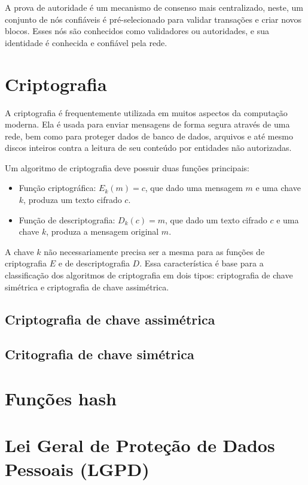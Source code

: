 A prova de autoridade é um mecanismo de consenso mais centralizado,
neste, um conjunto de nós confiáveis é
pré-selecionado para validar transações e criar novos blocos. Esses
nós são conhecidos como validadores
ou autoridades, e sua identidade é conhecida e confiável pela rede.
\cite{ethereum-docs}

\section{Criptografia}

A criptografia é frequentemente utilizada em muitos aspectos da
computação moderna. Ela é usada para enviar
mensagens de forma segura através de uma rede, bem como para proteger
dados de banco de dados,
arquivos e até mesmo discos inteiros contra a leitura de seu conteúdo
por entidades não autorizadas.
\cite{OperatingSystemsConcepts}

Um algoritmo de criptografia deve possuir duas funções principais:

\begin{itemize}
  \item Função criptográfica: $E_k(m) = c$, que dado uma mensagem $m$
    e uma chave $k$, produza um texto cifrado $c$.
  \item Função de descriptografia: $D_k(c) = m$, que dado um texto
    cifrado $c$ e uma chave $k$, produza a mensagem original $m$.
\end{itemize}

A chave $k$ não necessariamente precisa ser a mesma para as funções
de criptografia $E$ e de descriptografia $D$. Essa característica é
base para a classificação dos algoritmos de criptografia em dois
tipos: criptografia de chave simétrica e criptografia de chave assimétrica.

\subsection {Criptografia de chave assimétrica}

\subsection{Critografia de chave simétrica}

\section{Funções hash}

\section{Lei Geral de Proteção de Dados Pessoais (LGPD)}

